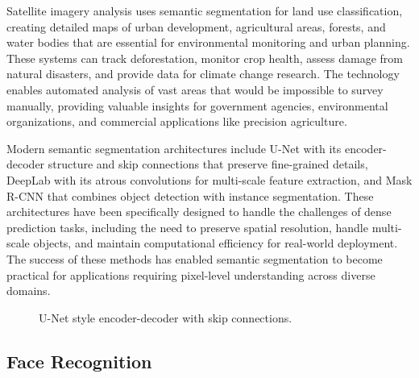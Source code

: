 Satellite imagery analysis uses semantic segmentation for land use classification, creating detailed maps of urban development, agricultural areas, forests, and water bodies that are essential for environmental monitoring and urban planning. These systems can track deforestation, monitor crop health, assess damage from natural disasters, and provide data for climate change research. The technology enables automated analysis of vast areas that would be impossible to survey manually, providing valuable insights for government agencies, environmental organizations, and commercial applications like precision agriculture.

Modern semantic segmentation architectures include U-Net with its encoder-decoder structure and skip connections that preserve fine-grained details, DeepLab with its atrous convolutions for multi-scale feature extraction, and Mask R-CNN that combines object detection with instance segmentation. These architectures have been specifically designed to handle the challenges of dense prediction tasks, including the need to preserve spatial resolution, handle multi-scale objects, and maintain computational efficiency for real-world deployment. The success of these methods has enabled semantic segmentation to become practical for applications requiring pixel-level understanding across diverse domains.

\begin{figure}[h]
  \centering
  \caption{U-Net style encoder-decoder with skip connections.}
  \label{fig:unet-schematic}
\end{figure}

\subsection{Face Recognition}

